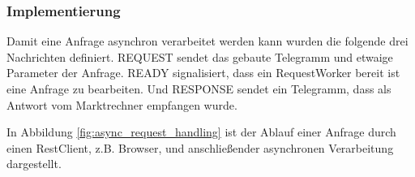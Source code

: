 \documentclass{article}
\begin{document}
\subsubsection{Implementierung}

Damit eine Anfrage asynchron verarbeitet werden kann wurden die folgende drei Nachrichten definiert. REQUEST sendet das gebaute Telegramm und etwaige Parameter der Anfrage. READY signalisiert, dass ein RequestWorker bereit ist eine Anfrage zu bearbeiten. Und RESPONSE sendet ein Telegramm, dass als Antwort vom Marktrechner empfangen wurde.

In Abbildung \ref{fig:async_request_handling} ist der Ablauf einer Anfrage durch einen RestClient, z.B. Browser, und anschließender asynchronen Verarbeitung dargestellt.

\end{document}
